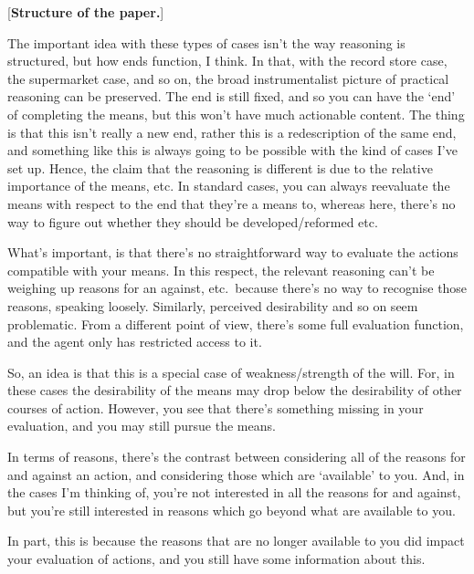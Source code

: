 \documentclass[10pt]{article}
\begin{document}
\begin{center}
  [\textbf{Structure of the paper.}]
\end{center}

\newpage

The important idea with these types of cases isn't the way reasoning is structured, but how ends function, I think.
In that, with the record store case, the supermarket case, and so on, the broad instrumentalist picture of practical reasoning can be preserved.
The end is still fixed, and so you can have the `end' of completing the means, but this won't have much actionable content.
The thing is that this isn't really a new end, rather this is a redescription of the same end, and something like this is always going to be possible with the kind of cases I've set up.
Hence, the claim that the reasoning is different is due to the relative importance of the means, etc.
In standard cases, you can always reevaluate the means with respect to the end that they're a means to, whereas here, there's no way to figure out whether they should be developed/reformed etc.

What's important, is that there's no straightforward way to evaluate the actions compatible with your means.
In this respect, the relevant reasoning can't be weighing up reasons for an against, etc.\ because there's no way to recognise those reasons, speaking loosely.
Similarly, perceived desirability and so on seem problematic.
From a different point of view, there's some full evaluation function, and the agent only has restricted access to it.

So, an idea is that this is a special case of weakness/strength of the will.
For, in these cases the desirability of the means may drop below the desirability of other courses of action.
However, you see that there's something missing in your evaluation, and you may still pursue the means.

In terms of reasons, there's the contrast between considering all of the reasons for and against an action, and considering those which are `available' to you.
And, in the cases I'm thinking of, you're not interested in all the reasons for and against, but you're still interested in reasons which go beyond what are available to you.

In part, this is because the reasons that are no longer available to you did impact your evaluation of actions, and you still have some information about this.
\end{document}

